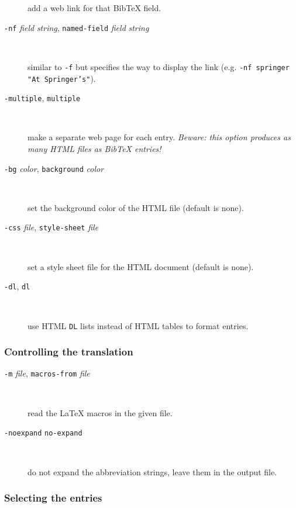 \documentclass[11pt,a4paper]{article}
\newcommand{\mm}{\symbol{45}\symbol{45}}
\begin{document}
\begin{description}
  add a web link for that BibTeX field.

  
\item[\texttt{-nf} \textit{field} \textit{string}, 
      \texttt{\mm{}named-field} \textit{field} \textit{string}] ~
  
  similar to \texttt{-f} but specifies the way to display the link
  (e.g. \texttt{-nf springer "At Springer's"}).

  
\item[\texttt{-multiple}, \texttt{\mm{}multiple}] ~
  
  make a separate web page for each entry.  \textit{Beware: this
    option produces as many HTML files as BibTeX entries!}

\item[\texttt{-bg} \textit{color}, \texttt{\mm{}background} \textit{color}] ~

  set the background color of the HTML file (default is none).

\item[\texttt{-css} \textit{file}, \texttt{\mm{}style-sheet} \textit{file}] ~

  set a style sheet file for the HTML document (default is none).

\item[\texttt{-dl}, \texttt{\mm{}dl}] ~

  use HTML \texttt{DL} lists instead of HTML tables to format entries.

\end{description}


\subsubsection{Controlling the translation}

\begin{description}
  
\item[\texttt{-m} \textit{file}, \texttt{\mm{}macros-from} \textit{file}] ~

  read the LaTeX macros in the given file.

\item[\texttt{-noexpand} \texttt{\mm{}no-expand}] ~

  do not expand the abbreviation strings, leave them in the output file.

\end{description}


\subsubsection{Selecting the entries}
\end{document}
